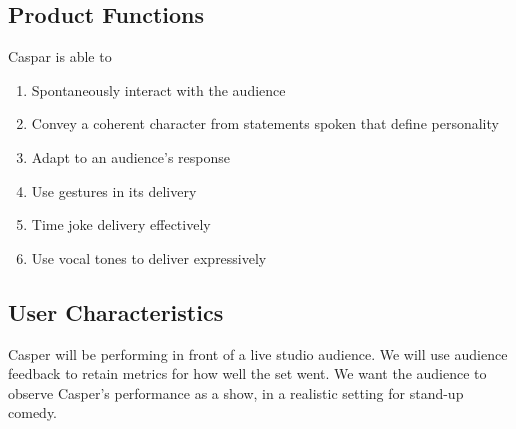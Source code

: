 \documentclass[onecolumn, draftclsnofoot,10pt, compsoc]{IEEEtran}
\begin{document}
\subsection{Product Functions}

Caspar is able to
\begin{enumerate}[\IEEEsetlabelwidth{6)}]
\item Spontaneously interact with the audience
\item Convey a coherent character from statements spoken that define personality
\item Adapt to an audience’s response
\item Use gestures in its delivery
\item Time joke delivery effectively
\item Use vocal tones to deliver expressively



\end{enumerate}



\subsection{User Characteristics}

Casper will be performing in front of a live studio audience. We will use audience feedback to retain metrics for how well the set went. We want the audience to observe Casper’s performance as a show, in a realistic setting for stand-up comedy.
\end{document}
